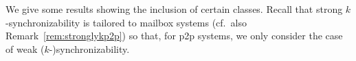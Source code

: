 \documentclass[a4paper,UKenglish,cleveref, autoref, thm-restate]{lipics-v2021}
\begin{document}
We give some results showing the inclusion of certain classes.
Recall that strong $k$-synchronizability is tailored to mailbox systems
(cf.\ also Remark~\ref{rem:stronglykp2p})
so that, for p2p systems, we only consider the case of
weak ($k$-)synchronizability.


\end{document}
